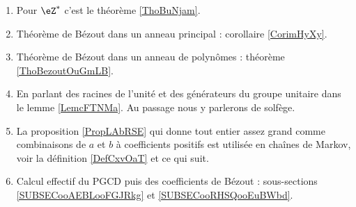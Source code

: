  \label{THEMEooNRZHooYuuHyt}
    \begin{enumerate}
        \item
            Pour \( \eZ^*\) c'est le théorème \ref{ThoBuNjam}.
        \item
            Théorème de Bézout dans un anneau principal : corollaire \ref{CorimHyXy}.
        \item
            Théorème de Bézout dans un anneau de polynômes : théorème \ref{ThoBezoutOuGmLB}.
        \item
            En parlant des racines de l'unité et des générateurs du groupe unitaire dans le lemme \ref{LemcFTNMa}. Au passage nous y parlerons de solfège.
        \item
            La proposition \ref{PropLAbRSE} qui donne tout entier assez grand comme combinaisons de \( a \) et \( b\) à coefficients positifs est utilisée en chaînes de Markov, voir la définition \ref{DefCxvOaT} et ce qui suit.
        \item
            Calcul effectif du PGCD puis des coefficients de Bézout : sous-sections \ref{SUBSECooAEBLooFGJRkg} et \ref{SUBSECooRHSQooEuBWbd}.
        \end{enumerate}

